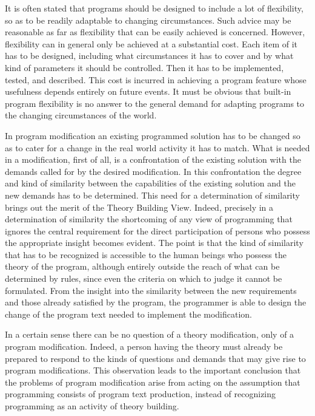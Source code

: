 \documentclass[12pt,letterpaper,twocolumn]{article}
\begin{document}
It is often stated that programs should be designed to include a lot of flexibility, so as to be readily adaptable to changing circumstances. Such advice may be reasonable as far as flexibility that can be easily achieved is concerned. However, flexibility can in general only be achieved at a substantial cost. Each item of it has to be designed, including what circumstances it has to cover and by what kind of parameters it should be controlled. Then it has to be implemented, tested, and described. This cost is incurred in achieving a program feature whose usefulness depends entirely on future events. It must be obvious that built-in program flexibility is no answer to the general demand for adapting programs to the changing circumstances of the world.

In program modification an existing programmed solution has to be changed so as to cater for a change in the real world activity it has to match. What is needed in a modification, first of all, is a confrontation of the existing solution with the demands called for by the desired modification. In this confrontation the degree and kind of similarity between the capabilities of the existing solution and the new demands has to be determined. This need for a determination of similarity brings out the merit of the Theory Building View. Indeed, precisely in a determination of similarity the shortcoming of any view of programming that ignores the central requirement for the direct participation of persons who possess the appropriate insight becomes evident. The point is that the kind of similarity that has to be recognized is accessible to the human beings who possess the theory of the program, although entirely outside the reach of what can be determined by rules, since even the criteria on which to judge it cannot be formulated. From the insight into the similarity between the new requirements and those already satisfied by the program, the programmer is able to design the change of the program text needed to implement the modification.

In a certain sense there can be no question of a theory modification, only of a program modification. Indeed, a person having the theory must already be prepared to respond to the kinds of questions and demands that may give rise to program modifications. This observation leads to the important conclusion that the problems of program modification arise from acting on the assumption that programming consists of program text production, instead of recognizing programming as an activity of theory building.
\end{document}
